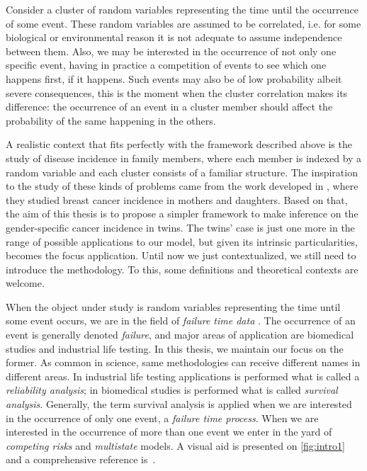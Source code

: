 Consider a cluster of random variables representing the time until the
occurrence of some event. These random variables are assumed to be
correlated, i.e. for some biological or environmental reason it is not
adequate to assume independence between them. Also, we may be interested
in the occurrence of not only one specific event, having in practice a
competition of events to see which one happens first, if it
happens. Such events may also be of low probability albeit severe
consequences, this is the moment when the cluster correlation makes its
difference: the occurrence of an event in a cluster member should affect
the probability of the same happening in the others.

A realistic context that fits perfectly with the framework described
above is the study of disease incidence in family members, where each
member is indexed by a random variable and each cluster consists of a
familiar structure. The inspiration to the study of these kinds of
problems came from the work developed in , where
they studied breast cancer incidence in mothers and daughters. Based on
that, the aim of this thesis is to propose a simpler framework to make
inference on the gender-specific cancer incidence in twins. The twins'
case is just one more in the range of possible applications to our
model, but given its intrinsic particularities, becomes the focus
application. Until now we just contextualized, we still need to
introduce the methodology. To this, some definitions and theoretical
contexts are welcome.

When the object under study is random variables representing the time
until some event occurs, we are in the field of \textit{failure time
  data} \cite{kalb&prentice}. The occurrence of an event is generally
denoted \textit{failure}, and major areas of application are biomedical
studies and industrial life testing. In this thesis, we maintain our
focus on the former. As common in science, same methodologies can
receive different names in different areas. In industrial life testing
applications is performed what is called a \textit{reliability
  analysis}; in biomedical studies is performed what is called
\textit{survival analysis}. Generally, the term survival analysis is
applied when we are interested in the occurrence of only one event, a
\textit{failure time process}. When we are interested in the occurrence
of more than one event we enter in the yard of \textit{competing risks}
and \textit{multistate} models. A visual aid is presented on
\autoref{fig:intro1} and a comprehensive reference
is~.

